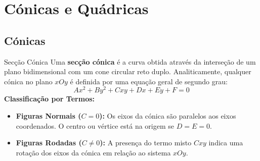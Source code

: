 \documentclass[11pt,a4paper]{article}
\begin{document}
\newpage


\section{Cónicas e Quádricas}

\subsection{Cónicas}

\noindent
\begin{minipage}{0.58\textwidth}
  \begin{definitionbox}{Secção Cónica}
    Uma \textbf{secção cónica} é a curva obtida através da interseção de um plano bidimensional com um cone circular reto duplo. 
    Analiticamente, qualquer cónica no plano $xOy$ é definida por uma equação geral de segundo grau:
    \begin{equation*}
      Ax^2 + By^2 + Cxy + Dx + Ey + F = 0
    \end{equation*}
    \textbf{Classificação por Termos:}
    \begin{itemize}
      \item \textbf{Figuras Normais ($C = 0$):} Os eixos da cónica são paralelos aos eixos coordenados. O centro ou vértice está na origem se $D = E = 0$.
      \item \textbf{Figuras Rodadas ($C \neq 0$):} A presença do termo misto $Cxy$ indica uma rotação dos eixos da cónica em relação ao sistema $xOy$.
    \end{itemize}
  \end{definitionbox}
\end{minipage}
\hfill
\end{document}

